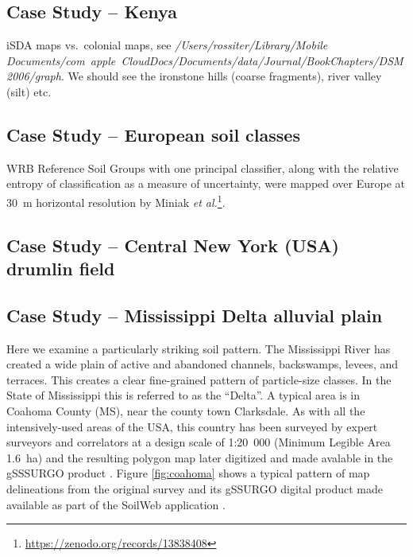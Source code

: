 \documentclass[soil, manuscript]{copernicus}
\begin{document}
\subsection{Case Study -- Kenya}

iSDA maps vs.\ colonial maps, see \emph{/Users/rossiter/Library/Mobile Documents/com~apple~CloudDocs/Documents/data/Journal/BookChapters/DSM2006/graph}. We should see the ironstone hills (coarse fragments), river valley (silt) etc.

\subsection{Case Study -- European soil classes}

WRB Reference Soil Groups with one principal classifier, along with the relative entropy of classification as a measure of uncertainty, were mapped over Europe at 30~m horizontal resolution by  Miniak \emph{et al.}\footnote{\url{https://zenodo.org/records/13838408}}.


\subsection{Case Study -- Central New York (USA) drumlin field}

\citep{naumanSoilLandscapesUnited2024}

\subsection{Case Study -- Mississippi Delta alluvial plain}

\par
Here we examine a particularly striking soil pattern.
%
The Mississippi River has created a wide plain of active and abandoned channels, backswamps, levees, and terraces.
%
This creates a clear fine-grained pattern of particle-size classes.
%
In the State of Mississippi this is referred to as the ``Delta''.
%
A typical area is in Coahoma County (MS), near the county town Clarksdale.
%
As with all the intensively-used areas of the USA, this country has been surveyed by expert surveyors and correlators  \citep{unitedstates.naturalresourcesconservationserviceSoilSurveyCoahoma1959} at a design scale of 1:20~000 (Minimum Legible Area 1.6~ha) and the resulting polygon map later digitized and made avalable in the gSSSURGO product \citep{nrcssoilsDescriptionGriddedSoil2022}.
%
Figure \ref{fig:coahoma} shows a typical pattern of map delineations from the original survey and its gSSURGO digital product made available as part of the SoilWeb application \citep{californiasoilresourcelabSoilWebApps, OGeenSoilWebMultifacetedInterface2017}.
\end{document}
